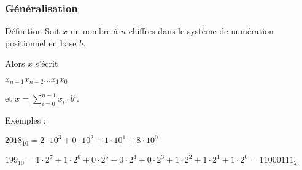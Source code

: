 	\frame
	{
		\frametitle{G\'en\'eralisation}
		\begin{block}{D\'efinition}
			Soit $x$ un nombre \`a $n$ chiffres dans le syst\`eme de num\'eration positionnel en base $b$.
			
			Alors $x$ s'\'ecrit
			
			$x_{n-1}x_{n-2}\ldots x_1x_0$
			
			et $x=\sum\limits_{i = 0}^{n-1}x_i\cdot b^i$.
		\end{block}
		
		Exemples :
		\begin{description}
			\item<2-> $2018_{10} = 2\cdot10^3 + 0\cdot10^2 + 1\cdot10^1+8\cdot10^0$
			\item<3-> $199_{10} = 1\cdot2^7 + 1\cdot2^6 + 0\cdot2^5+0\cdot2^4 + 0\cdot2^3 + 1\cdot2^2 + 1\cdot2^1+1\cdot2^0 = 11000111_2$
		\end{description}
	}


